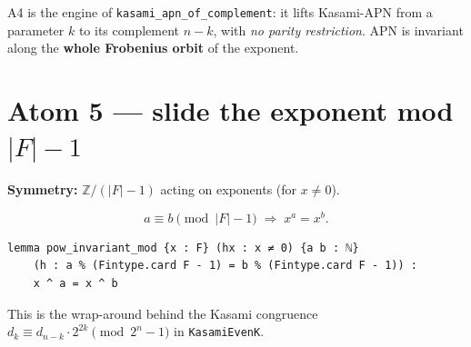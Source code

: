 \documentclass[11pt]{article}
\begin{document}
\begin{center}
\end{center}

\begin{bigidea}
A4 is the engine of \texttt{kasami\_apn\_of\_complement}: it lifts Kasami-APN
from a parameter $k$ to its complement $n-k$, with \emph{no parity restriction}.
APN is invariant along the \textbf{whole Frobenius orbit} of the exponent.
\end{bigidea}

\section{Atom 5 --- slide the exponent mod $|F|-1$}

\textbf{Symmetry:} $\mathbb{Z}/(|F|{-}1)$ acting on exponents (for $x\neq 0$).

\[
  a\equiv b \pmod{|F|-1}\;\Longrightarrow\;x^{a}=x^{b}.
\]

\begin{lstlisting}
lemma pow_invariant_mod {x : F} (hx : x ≠ 0) {a b : ℕ}
    (h : a % (Fintype.card F - 1) = b % (Fintype.card F - 1)) :
    x ^ a = x ^ b
\end{lstlisting}

\begin{center}
\end{center}

\begin{remarkbox}
This is the wrap-around behind the Kasami congruence
$d_k\equiv d_{n-k}\cdot 2^{2k}\pmod{2^n-1}$ in \texttt{KasamiEvenK}.
\end{remarkbox}

\end{document}
